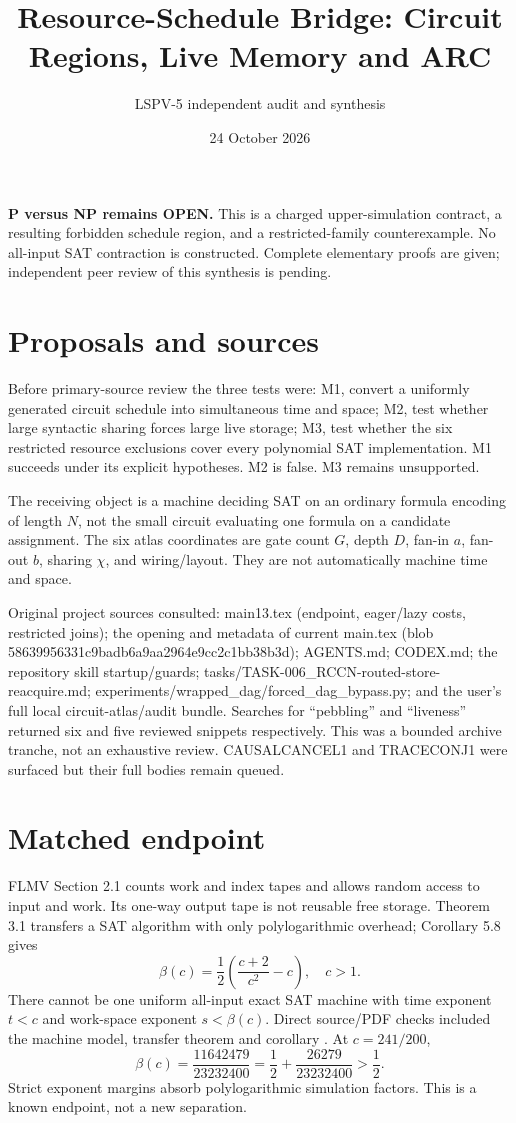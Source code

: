 \documentclass[11pt]{article}
\title{Resource-Schedule Bridge: Circuit Regions, Live Memory and ARC}
\author{LSPV-5 independent audit and synthesis}
\date{24 October 2026}
\begin{document}
\maketitle
\noindent\textbf{P versus NP remains OPEN.} This is a charged upper-simulation contract, a resulting forbidden schedule region, and a restricted-family counterexample. No all-input SAT contraction is constructed. Complete elementary proofs are given; independent peer review of this synthesis is pending.

\section{Proposals and sources}
Before primary-source review the three tests were: M1, convert a uniformly generated circuit schedule into simultaneous time and space; M2, test whether large syntactic sharing forces large live storage; M3, test whether the six restricted resource exclusions cover every polynomial SAT implementation. M1 succeeds under its explicit hypotheses. M2 is false. M3 remains unsupported.

The receiving object is a machine deciding SAT on an ordinary formula encoding of length $N$, not the small circuit evaluating one formula on a candidate assignment. The six atlas coordinates are gate count $G$, depth $D$, fan-in $a$, fan-out $b$, sharing $\chi$, and wiring/layout. They are not automatically machine time and space.

Original project sources consulted: main13.tex (endpoint, eager/lazy costs, restricted joins); the opening and metadata of current main.tex (blob 58639956331c9badb6a9aa2964e9cc2c1bb38b3d); AGENTS.md; CODEX.md; the repository skill startup/guards; tasks/TASK-006\_RCCN-routed-store-reacquire.md; experiments/wrapped\_dag/forced\_dag\_bypass.py; and the user's full local circuit-atlas/audit bundle. Searches for ``pebbling'' and ``liveness'' returned six and five reviewed snippets respectively. This was a bounded archive tranche, not an exhaustive review. CAUSALCANCEL1 and TRACECONJ1 were surfaced but their full bodies remain queued.

\section{Matched endpoint}
FLMV Section 2.1 counts work and index tapes and allows random access to input and work. Its one-way output tape is not reusable free storage. Theorem 3.1 transfers a SAT algorithm with only polylogarithmic overhead; Corollary 5.8 gives
\[
\beta(c)=\frac12\left(\frac{c+2}{c^2}-c\right),\quad c>1.
\]
There cannot be one uniform all-input exact SAT machine with time exponent $t<c$ and work-space exponent $s<\beta(c)$. Direct source/PDF checks included the machine model, transfer theorem and corollary \cite{flmv}. At $c=241/200$,
\[
\beta(c)=\frac{11642479}{23232400}=\frac12+\frac{26279}{23232400}>\frac12.
\]
Strict exponent margins absorb polylogarithmic simulation factors. This is a known endpoint, not a new separation.
\end{document}
